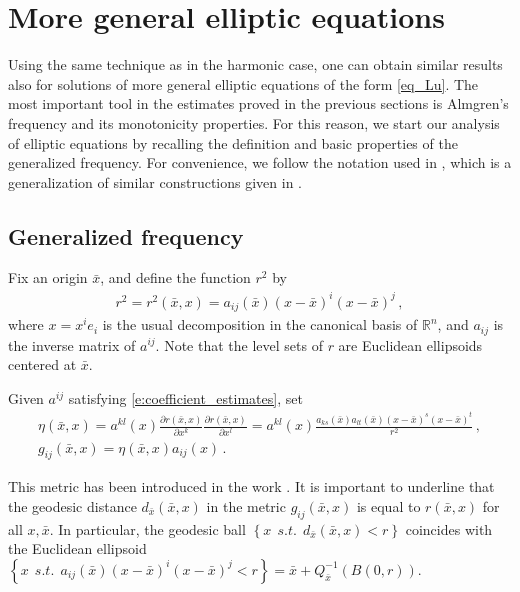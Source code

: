 \documentclass[11pt]{article}
\begin{document}
\section{More general elliptic equations}\label{s:general_elliptic}
Using the same technique as in the harmonic case, one can obtain similar results also for solutions of more general elliptic equations of the form \eqref{eq_Lu}. The most important tool in the estimates proved in the previous sections is Almgren's frequency and its monotonicity properties. For this reason, we start our analysis of elliptic equations by recalling the definition and basic properties of the generalized frequency. For convenience, we follow the notation used in \cite{chnava}, which is a generalization of similar constructions given in \cite{galin1,galin2,HLrank,hanlin,hanhardtlin}.

\subsection{Generalized frequency}\label{ss:generalized_frequency}

 Fix an origin $\bar x$, and define the function $r^2$ by
\begin{gather}
 r^2=r^2(\bar x,x)=a_{ij}(\bar x) (x-\bar x)^i (x-\bar x)^j\, ,
\end{gather}
where $x=x^ie_i$ is the usual decomposition in the canonical basis of ${\mathbb{R}}^n$, and $a_{ij}$ is the inverse matrix of $a^{ij}$. Note that the level sets 
of $r$ are Euclidean ellipsoids centered at $\bar x$.
\begin{definition}\label{prop_gij}
 Given $a^{ij}$ satisfying \eqref{e:coefficient_estimates}, set
\begin{gather}
 \eta(\bar x,x)={a^{kl}(x)\frac{\partial r(\bar x,x)}{\partial x^k}\frac{\partial r(\bar x,x)}{\partial x^l}}
={a^{kl}(x)\frac{a_{ks}(\bar x)a_{lt}(\bar x)(x-\bar x)^s(x-\bar x)^t}{r^2}}\, ,\\
g_{ij}(\bar x,x)=\eta(\bar x,x)a_{ij}(x)\, .
\end{gather}
\end{definition}
\begin{remark}
 This metric has been introduced in the work \cite{toc}. It is important to underline that the geodesic distance $d_{\bar x}(\bar x,x)$ in the metric $g_{ij}(\bar x,x)$ is equal to $r(\bar x,x)$ for all $x,\bar x$. In particular, the geodesic ball ${\left\{{x\ \ s.t. \ \ d_{\bar x}(\bar x,x)<r}\right\}}$ coincides with the Euclidean ellipsoid ${\left\{{x \ \ s.t. \ \ a_{ij}(\bar x) (x-\bar x)^i (x-\bar x )^j <r}\right\}}=\bar x + Q_{\bar x} ^{-1}  (B(0,r))$.
\end{remark}
\end{document}
